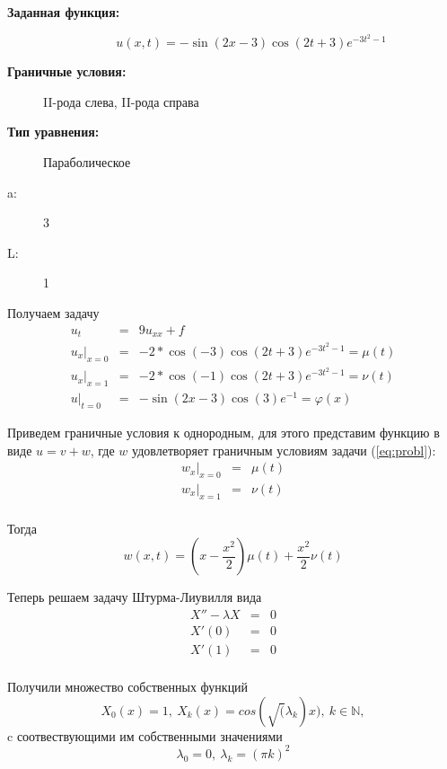 \documentclass[a4paper,11pt]{article}
\begin{document}
  \begin{description}
    \item[\textbf{Заданная функция:}] \[  u(x, t) = -\sin(2x-3)\cos(2t+3)e^{-3t^2-1} \]
    \item[\textbf{Граничные условия:}] II-рода слева, II-рода справа
    \item[\textbf{Тип уравнения:}] Параболическое
    \item[a:] 3
    \item[L:] 1
  \end{description}

Получаем задачу
\begin{equation}\label{eq:probl}
  \begin{array}{lll}
    u_t  & = &  9u_{xx} + f \\
    u_x|_{x=0}& = & -2*\cos(-3)\cos(2t+3)e^{-3t^2-1} = \mu(t) \\
    u_x|_{x=1} & = &-2*\cos(-1)\cos(2t+3)e^{-3t^2-1} = \nu(t)\\
    u|_{t=0}   & =  &-\sin(2x-3)\cos(3)e^{-1} = \varphi(x)
  \end{array}
  \end{equation}

Приведем граничные условия к однородным, для этого представим функцию в виде $u = v + w$, где $w$ удовлетворяет граничным условиям задачи (\ref{eq:probl}):
\begin{equation}
  \begin{array}{lll}
    w_x|_{x=0} &=& \mu(t) \\
    w_x|_{x=1} &=& \nu(t) \\
  \end{array}
\end{equation}

Тогда
  \[ w(x, t) = (x - \frac{x^2}{2})\mu(t) + \frac{x^2}{2}\nu(t) \]

Теперь решаем задачу Штурма-Лиувилля вида
\begin{equation}
  \begin{array}{lll}
    X'' - \lambda X  &= & 0 \\
    X'(0) & = & 0 \\
    X'(1) & = & 0 \\
  \end{array}
\end{equation}

Получили множество собственных функций
\[ X_0(x) = 1, ~ X_k(x) = cos(\sqrt(\lambda_k)x),~ k \in \mathbb{N},  \]
c соотвествующими им собственными значениями
\[ \lambda_0 = 0, ~ \lambda_k = (\pi k)^2\]
\end{document}
